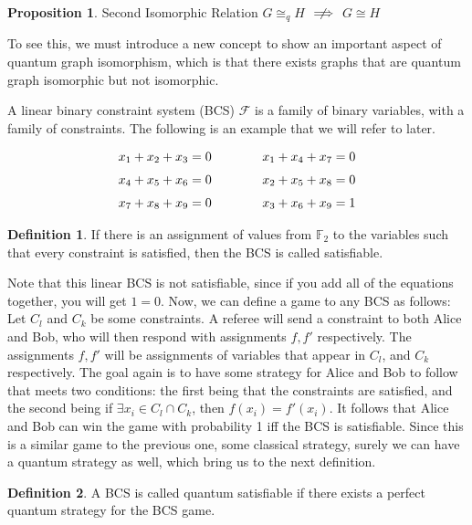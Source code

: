 \documentclass[12pt]{article}
\theoremstyle{definition}
\newtheorem{defn}{Definition}[section]
\theoremstyle{proposition}
\newtheorem{proposition}{Proposition}[section]
\theoremstyle{lemma}
\begin{document}
\begin{proposition}{Second Isomorphic Relation}
$G \cong_q H$ $\centernot\implies$ $G \cong H$
\end{proposition}
To see this, we must introduce a new concept to show an important aspect of quantum graph isomorphism, which is that there exists graphs that are quantum graph isomorphic but not isomorphic.

A linear binary constraint system (BCS) $\mathcal{F}$ is a family of binary variables, with a family of constraints. The following is an example that we will refer to later.

\begin{equation*}
\openup\jot %
\begin{aligned}[t]
x_1 + x_2 + x_3 &= 0 \\
x_4 + x_5 + x_6 &= 0 \\
x_7 + x_8 + x_9 &= 0
\end{aligned}
\qquad\qquad %
\begin{aligned}[t]
x_1 + x_4 + x_7 &= 0 \\
x_2 + x_5 + x_8 &= 0 \\
x_3 + x_6 + x_9 &= 1
\end{aligned}
\end{equation*}

\begin{defn}
If there is an assignment of values from $\mathbb{F}_2$ to the variables such that every constraint is satisfied, then the BCS is called satisfiable.
\end{defn}
Note that this linear BCS is not satisfiable, since if you add all of the equations together, you will get $1=0$. Now, we can define a game to any BCS as follows: Let $C_l$ and $C_k$ be some constraints. A referee will send a constraint to both Alice and Bob, who will then respond with assignments $f, f'$ respectively. The assignments $f, f'$ will be assignments of variables that appear in $C_l$, and $C_k$ respectively. The goal again is to have some strategy for Alice and Bob to follow that meets two conditions: the first being that the constraints are satisfied, and the second being if $\exists x_i \in C_l \cap C_k$, then $f(x_i) = f'(x_i)$. It follows that Alice and Bob can win the game with probability 1 iff the BCS is satisfiable. Since this is a similar game to the previous one, some classical strategy, surely we can have a quantum strategy as well, which bring us to the next definition.
\begin{defn}
A BCS is called quantum satisfiable if there exists a perfect quantum strategy for the BCS game.
\end{defn}
\end{document}
